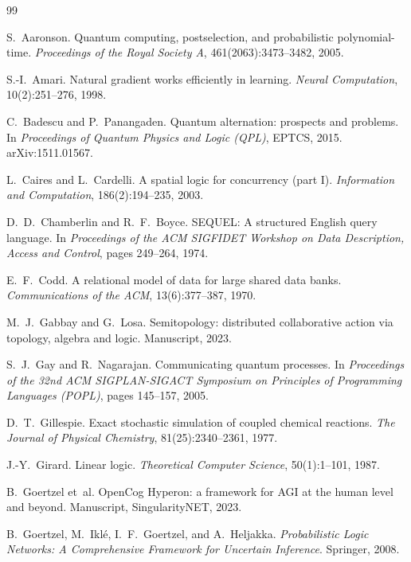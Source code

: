 \documentclass[11pt]{article}
\theoremstyle{definition}
\theoremstyle{plain}
\theoremstyle{remark}
\begin{document}
\begin{thebibliography}{99}\small

S.~Aaronson.
\newblock Quantum computing, postselection, and probabilistic polynomial-time.
\newblock \emph{Proceedings of the Royal Society A}, 461(2063):3473--3482, 2005.

S.-I.~Amari.
\newblock Natural gradient works efficiently in learning.
\newblock \emph{Neural Computation}, 10(2):251--276, 1998.

C.~Badescu and P.~Panangaden.
\newblock Quantum alternation: prospects and problems.
\newblock In \emph{Proceedings of Quantum Physics and Logic (QPL)}, EPTCS, 2015.
\newblock arXiv:1511.01567.

L.~Caires and L.~Cardelli.
\newblock A spatial logic for concurrency (part I).
\newblock \emph{Information and Computation}, 186(2):194--235, 2003.

D.~D.~Chamberlin and R.~F.~Boyce.
\newblock SEQUEL: A structured English query language.
\newblock In \emph{Proceedings of the ACM SIGFIDET Workshop on Data Description,
Access and Control}, pages 249--264, 1974.

E.~F.~Codd.
\newblock A relational model of data for large shared data banks.
\newblock \emph{Communications of the ACM}, 13(6):377--387, 1970.

M.~J.~Gabbay and G.~Losa.
\newblock Semitopology: distributed collaborative action via topology, algebra
and logic.
\newblock Manuscript, 2023.

S.~J.~Gay and R.~Nagarajan.
\newblock Communicating quantum processes.
\newblock In \emph{Proceedings of the 32nd ACM SIGPLAN-SIGACT Symposium on
Principles of Programming Languages (POPL)}, pages 145--157, 2005.

D.~T.~Gillespie.
\newblock Exact stochastic simulation of coupled chemical reactions.
\newblock \emph{The Journal of Physical Chemistry}, 81(25):2340--2361, 1977.

J.-Y.~Girard.
\newblock Linear logic.
\newblock \emph{Theoretical Computer Science}, 50(1):1--101, 1987.

B.~Goertzel et~al.
\newblock OpenCog Hyperon: a framework for AGI at the human level and beyond.
\newblock Manuscript, SingularityNET, 2023.

B.~Goertzel, M.~Ikl\'{e}, I.~F.~Goertzel, and A.~Heljakka.
\newblock \emph{Probabilistic Logic Networks: A Comprehensive Framework for
Uncertain Inference}.
\newblock Springer, 2008.


\end{thebibliography}
\end{document}
